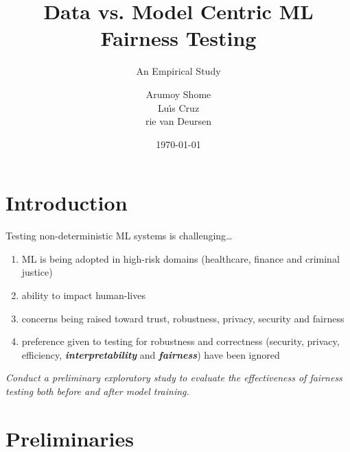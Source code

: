 \documentclass[aspectratio=169]{beamer}
\title{Data vs. Model Centric ML Fairness Testing}
\subtitle{An Empirical Study}
\author{Arumoy Shome\texorpdfstring{\\}{,} Lu{\'\i}s
  Cruz\texorpdfstring{\\}Arie van Deursen}
\institute{Delft University of Technology}
\date{\today}
\begin{document}
\begin{frame}
  \maketitle
\end{frame}

\section{Introduction}

\begin{frame}{Testing non-deterministic ML systems is challenging\ldots}
  \begin{enumerate}
    \item ML is being adopted in high-risk domains (healthcare,
      finance and criminal justice)
    \item ability to impact human-lives
    \item concerns being raised toward trust, robustness, privacy,
      security and fairness
    \item preference given to testing for robustness and correctness
      (security, privacy, efficiency, \textbf{\emph{interpretability}}
      and \textbf{\emph{fairness}}) have been ignored
  \end{enumerate}
\end{frame}
\begin{frame}[focus]
  \emph{Conduct a preliminary exploratory study to evaluate the
  effectiveness of fairness testing both before and after model
  training.}
\end{frame}

\section{Preliminaries}
\end{document}
